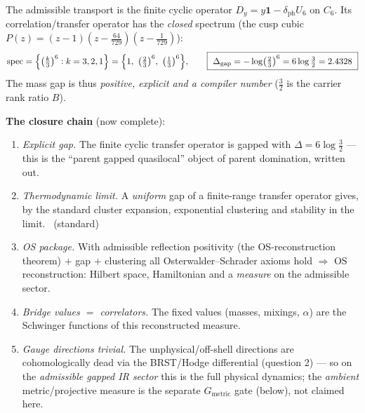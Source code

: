 \documentclass[11pt,a4paper]{article}
\theoremstyle{definition}
\begin{document}
\begin{keybox}
The admissible transport is the finite cyclic operator $D_y=y\mathbf 1-\delta_{\mathrm{ph}}U_6$ on $C_6$.
Its correlation/transfer operator has the \emph{closed} spectrum (the cusp cubic
$P(z)=(z-1)(z-\tfrac{64}{729})(z-\tfrac1{729})$):
\[
  \mathrm{spec}=\Bigl\{\bigl(\tfrac{k}{3}\bigr)^6:k=3,2,1\Bigr\}=\Bigl\{1,\ \bigl(\tfrac23\bigr)^6,\ \bigl(\tfrac13\bigr)^6\Bigr\},
  \qquad
  \boxed{\ \Delta_{\mathrm{gap}}=-\log\bigl(\tfrac23\bigr)^6=6\log\tfrac32=2.4328\ }
\]
The mass gap is thus \emph{positive, explicit and a compiler number} ($\tfrac32$ is the carrier rank
ratio $B$). \mE
\end{keybox}

\begin{center}
\end{center}

\noindent\textbf{The closure chain} (now complete):
\begin{enumerate}[leftmargin=1.6em]
\item \emph{Explicit gap.} The finite cyclic transfer operator is gapped with $\Delta=6\log\tfrac32$ ---
      this is the ``parent gapped quasilocal'' object of parent domination, written out. \mE
\item \emph{Thermodynamic limit.} A \emph{uniform} gap of a finite-range transfer operator gives, by the
      standard cluster expansion, exponential clustering and stability in the limit. \mE\ (standard)
\item \emph{OS package.} With admissible reflection positivity (the OS-reconstruction theorem) $+$ gap $+$ clustering
      all Osterwalder--Schrader axioms hold $\Rightarrow$ OS reconstruction: Hilbert space, Hamiltonian
      and a \emph{measure} on the admissible sector. \mE
\item \emph{Bridge values $=$ correlators.} The fixed values (masses, mixings, $\alpha$) are the
      Schwinger functions of this reconstructed measure.
\item \emph{Gauge directions trivial.} The unphysical/off-shell directions are cohomologically dead via
      the BRST/Hodge differential (question 2) --- so on the \emph{admissible gapped IR sector} this is the
      full physical dynamics; the \emph{ambient} metric/projective measure is the separate $G_{\mathrm{metric}}$
      gate (below), not claimed here.
\end{enumerate}
\end{document}
